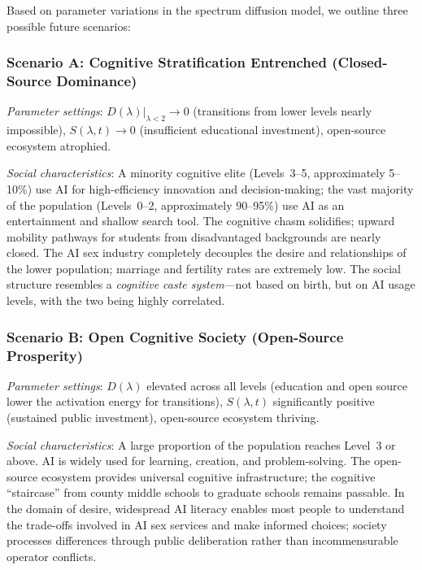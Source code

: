 ﻿\documentclass[12pt,a4paper]{article}
\begin{document}
Based on parameter variations in the spectrum diffusion model, we outline three possible future scenarios:

\subsubsection{Scenario A: Cognitive Stratification Entrenched (Closed-Source Dominance)}

\textit{Parameter settings}: $D(\lambda)|_{\lambda<2} \to 0$ (transitions from lower levels nearly impossible), $S(\lambda, t) \to 0$ (insufficient educational investment), open-source ecosystem atrophied.

\textit{Social characteristics}: A minority cognitive elite (Levels~3--5, approximately 5--10\%) use AI for high-efficiency innovation and decision-making; the vast majority of the population (Levels~0--2, approximately 90--95\%) use AI as an entertainment and shallow search tool. The cognitive chasm solidifies; upward mobility pathways for students from disadvantaged backgrounds are nearly closed. The AI sex industry completely decouples the desire and relationships of the lower population; marriage and fertility rates are extremely low. The social structure resembles a \emph{cognitive caste system}---not based on birth, but on AI usage levels, with the two being highly correlated.

\subsubsection{Scenario B: Open Cognitive Society (Open-Source Prosperity)}

\textit{Parameter settings}: $D(\lambda)$ elevated across all levels (education and open source lower the activation energy for transitions), $S(\lambda, t)$ significantly positive (sustained public investment), open-source ecosystem thriving.

\textit{Social characteristics}: A large proportion of the population reaches Level~3 or above. AI is widely used for learning, creation, and problem-solving. The open-source ecosystem provides universal cognitive infrastructure; the cognitive ``staircase'' from county middle schools to graduate schools remains passable. In the domain of desire, widespread AI literacy enables most people to understand the trade-offs involved in AI sex services and make informed choices; society processes differences through public deliberation rather than incommensurable operator conflicts.
\end{document}
